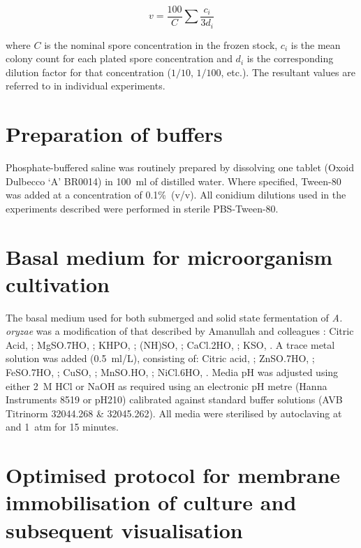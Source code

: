 \begin{equation}
	v = \frac{100}{C} \sum \frac{c_i}{3d_i}
\end{equation}

\noindent where $C$ is the nominal spore concentration in the frozen stock, $c_i$ is the mean colony count for each plated spore concentration and $d_i$ is the corresponding dilution factor for that concentration ($1/10$, $1/100$, etc.). The resultant values are referred to in individual experiments.

\section{Preparation of buffers}

Phosphate-buffered saline was routinely prepared by dissolving one tablet (Oxoid Dulbecco \lq A' BR0014) in 100~ml of distilled water. Where specified, Tween-80 was added at a concentration of 0.1\%~(v/v). All conidium dilutions used in the experiments described were performed in sterile PBS-Tween-80.

\section{Basal medium for microorganism cultivation}\label{sec:BasalMedium}

The basal medium used for both submerged and solid state fermentation of \emph{A. oryzae} was a modification of that described  by Amanullah and colleagues \cite{amanullah2000}: Citric Acid, ; MgSO.7HO, ; KHPO, ; (NH)SO, ; CaCl.2HO, ; KSO, . A trace metal solution was added (0.5~ml/L), consisting of: Citric acid, ; ZnSO.7HO, ; FeSO.7HO, ; CuSO, ; MnSO.HO, ; NiCl.6HO, . Media pH was adjusted using either 2~M HCl or NaOH as required using an electronic pH metre (Hanna Instruments 8519 or pH210) calibrated against standard buffer solutions (AVB Titrinorm 32044.268 \& 32045.262). All media were sterilised by autoclaving at  and 1~atm for 15 minutes.

\section{Optimised protocol for membrane immobilisation of culture and subsequent visualisation}\label{sec:OptAssay}

